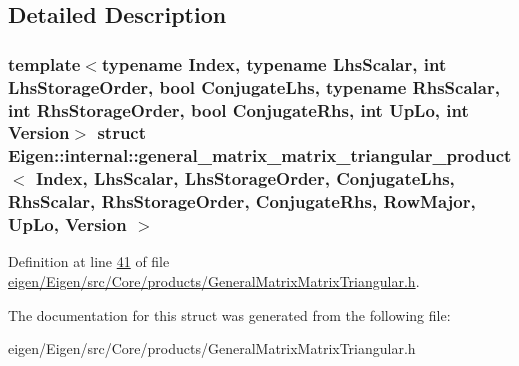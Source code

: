 \subsection{Detailed Description}
\subsubsection*{template$<$typename Index, typename Lhs\+Scalar, int Lhs\+Storage\+Order, bool Conjugate\+Lhs, typename Rhs\+Scalar, int Rhs\+Storage\+Order, bool Conjugate\+Rhs, int Up\+Lo, int Version$>$\newline
struct Eigen\+::internal\+::general\+\_\+matrix\+\_\+matrix\+\_\+triangular\+\_\+product$<$ Index, Lhs\+Scalar, Lhs\+Storage\+Order, Conjugate\+Lhs, Rhs\+Scalar, Rhs\+Storage\+Order, Conjugate\+Rhs, Row\+Major, Up\+Lo, Version $>$}



Definition at line \hyperlink{eigen_2_eigen_2src_2_core_2products_2_general_matrix_matrix_triangular_8h_source_l00041}{41} of file \hyperlink{eigen_2_eigen_2src_2_core_2products_2_general_matrix_matrix_triangular_8h_source}{eigen/\+Eigen/src/\+Core/products/\+General\+Matrix\+Matrix\+Triangular.\+h}.



The documentation for this struct was generated from the following file\+:\begin{DoxyCompactItemize}
\item 
eigen/\+Eigen/src/\+Core/products/\+General\+Matrix\+Matrix\+Triangular.\+h\end{DoxyCompactItemize}
